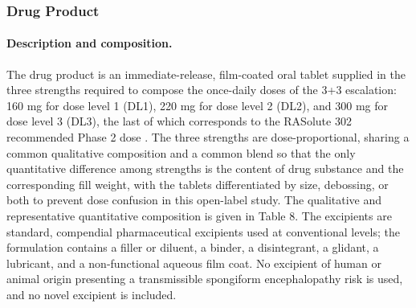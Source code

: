 \subsubsection{Drug Product}

\paragraph{Description and composition.}
The drug product is an immediate-release, film-coated oral tablet supplied in the
three strengths required to compose the once-daily doses of the 3+3 escalation:
160 mg for dose level 1 (DL1), 220 mg for dose level 2 (DL2), and 300 mg for
dose level 3 (DL3), the last of which corresponds to the RASolute 302 recommended
Phase 2 dose \cite{daraxwhipple,pdac060s2030}. The three strengths are
dose-proportional, sharing a common qualitative composition and a common blend so
that the only quantitative difference among strengths is the content of drug
substance and the corresponding fill weight, with the tablets differentiated by
size, debossing, or both to prevent dose confusion in this open-label study. The
qualitative and representative quantitative composition is given in Table 8. The
excipients are standard, compendial pharmaceutical excipients used at
conventional levels; the formulation contains a filler or diluent, a binder, a
disintegrant, a glidant, a lubricant, and a non-functional aqueous film coat. No
excipient of human or animal origin presenting a transmissible spongiform
encephalopathy risk is used, and no novel excipient is included.

